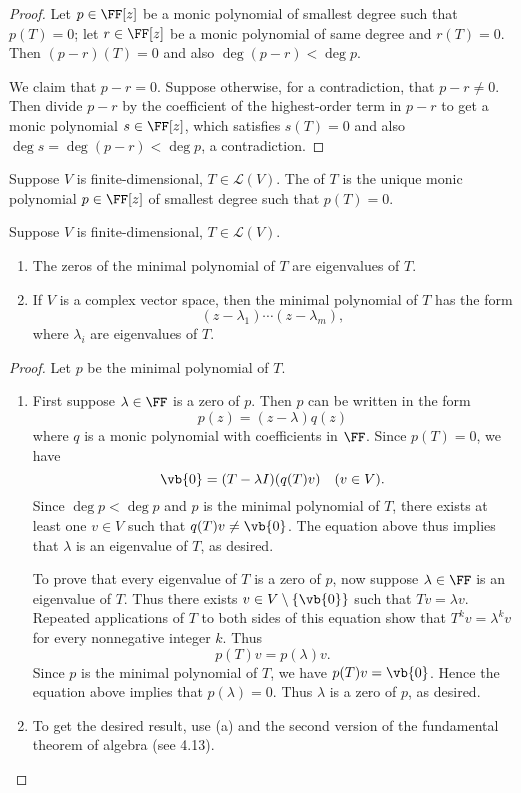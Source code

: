\begin{proof}
 Let $p\in\FF[z]$ be a monic polynomial of smallest degree such that $p(T)=0$; let $r\in\FF[z]$ be a monic polynomial of same degree and $r(T)=0$. Then $(p-r)(T)=0$ and also $\deg(p-r)<\deg p$.

We claim that $p-r=0$. Suppose otherwise, for a contradiction, that $p-r\neq0$. Then divide $p-r$ by the coefficient of the highest-order term in $p-r$ to get a monic polynomial $s\in\FF[z]$, which satisfies $s(T)=0$ and also $\deg s=\deg(p-r)<\deg p$, a contradiction.
\end{proof}

\begin{definition}
Suppose $V$ is finite-dimensional, $T\in\mathcal{L}(V)$. The  of $T$ is the unique monic polynomial $p\in\FF[z]$ of smallest degree such that $p(T)=0$.
\end{definition}

\begin{theorem}
Suppose $V$ is finite-dimensional, $T\in\mathcal{L}(V)$.
\begin{enumerate}[label=(\roman*)]
\item The zeros of the minimal polynomial of $T$ are eigenvalues of $T$.
\item If $V$ is a complex vector space, then the minimal polynomial of $T$ has the form
\[(z-\lambda_1)\cdots(z-\lambda_m),\]
where $\lambda_i$ are eigenvalues of $T$.
\end{enumerate}
\end{theorem}

\begin{proof}
Let $p$ be the minimal polynomial of $T$.
\begin{enumerate}[label=(\roman*)]
\item First suppose $\lambda\in\FF$ is a zero of $p$. Then $p$ can be written in the form
\[p(z)=(z-\lambda)q(z)\]
where $q$ is a monic polynomial with coefficients in $\FF$. Since $p(T)=0$, we have
\[\vb{0}=(T-\lambda I)(q(T)v)\quad(v\in V).\]
Since $\deg p<\deg p$ and $p$ is the minimal polynomial of $T$, there exists at least one $v\in V$ such that $q(T)v\neq\vb{0}$. The equation above thus implies that $\lambda$ is an eigenvalue of $T$, as desired.

To prove that every eigenvalue of $T$ is a zero of $p$, now suppose $\lambda\in\FF$ is an eigenvalue of $T$. Thus there exists $v\in V\setminus\{\vb{0}\}$ such that $Tv=\lambda v$. Repeated applications of $T$ to both sides of this equation show that $T^k v=\lambda^k v$ for every nonnegative integer $k$. Thus
\[p(T)v=p(\lambda)v.\]
Since $p$ is the minimal polynomial of $T$, we have $p(T)v=\vb{0}$. Hence the equation above implies that $p(\lambda)=0$. Thus $\lambda$ is a zero of $p$, as desired.

\item To get the desired result, use (a) and the second version of the fundamental theorem of algebra (see 4.13).
\end{enumerate}
\end{proof}

